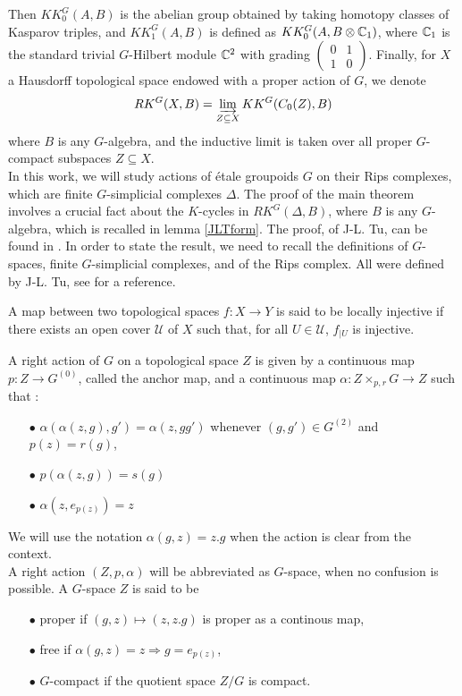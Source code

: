 Then $KK_0^G(A,B)$ is the abelian group obtained by taking homotopy classes of Kasparov triples, and $KK_1^G(A,B)$ is defined as $KK_0^G(A,B\otimes \mathbb C_1)$, where $\mathbb C_1$ is the standard trivial $G$-Hilbert module $\mathbb C^2$ with grading $\begin{pmatrix} 0 & 1 \\ 1 & 0 \end{pmatrix}$. Finally, for $X$ a Hausdorff topological space endowed with a proper action of $G$, we denote 
\[RK^G(X,B) = \varinjlim_{Z\subseteq X} KK^G(C_0(Z),B)\]
where $B$ is any $G$-algebra, and the inductive limit is taken over all proper $G$-compact subspaces $Z\subseteq X$.\\

In this work, we will study actions of \'etale groupoids $G$ on their Rips complexes, which are finite $G$-simplicial complexes $\Delta$. The proof of the main theorem involves a crucial fact about the $K$-cycles in $RK^G(\Delta,B)$, where $B$ is any $G$-algebra, which is recalled in lemma \ref{JLTform}. The proof, of J-L. Tu, can be found in \cite{TuBC2}. In order to state the result, we need to recall the definitions of $G$-spaces, finite $G$-simplicial complexes, and of the Rips complex. All were defined by J-L. Tu, see \cite{TuBC2} for a reference.

\begin{definition}
A map between two topological spaces $f : X\rightarrow Y$ is said to be locally injective if there exists an open cover $\mathcal U$ of $X$ such that, for all $U\in \mathcal U$, $f_{|U}$ is injective.
\end{definition}

A right action of $G$ on a topological space $Z$ is given by a continuous map $p : Z \rightarrow G^{(0)}$, called the anchor map, and a continuous map $\alpha : Z\times_{p,r} G \rightarrow Z $ such that :
\begin{itemize}
\item[$\bullet$] $\alpha(\alpha(z,g),g') = \alpha(z, gg')$ whenever $(g,g')\in G^{(2)}$ and $p(z)=r(g)$,
\item[$\bullet$] $p(\alpha(z,g))= s(g)$
\item[$\bullet$] $\alpha(z,e_{p(z)})=z$
\end{itemize} We will use the notation $\alpha(g,z) = z.g$ when the action is clear from the context.\\ 

A right action $(Z,p,\alpha)$ will be abbreviated as $G$-space, when no confusion is possible. A $G$-space $Z$ is said to be 
\begin{itemize}
\item[$\bullet$] proper if $(g,z) \mapsto (z,z.g) $ is proper as a continous map,
\item[$\bullet$] free if $\alpha(g,z)=z \Rightarrow g=e_{p(z)} $,
\item[$\bullet$] $G$-compact if the quotient space $Z/G$ is compact.
\end{itemize}

